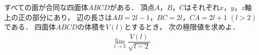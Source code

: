 \documentclass[../../main.tex]{subfiles}
\begin{document}
すべての面が合同な四面体$ABCD$がある．
頂点$A$，$B$，$C$はそれぞれ$x$，$y$，$z$軸上の正の部分にあり，
辺の長さは$AB=2l-1$，$BC=2l$，$CA=2l+1$ $(l>2)$である．
四面体$ABCD$の体積を$V(l)$とするとき，
次の極限値を求めよ．
\begin{align*}
  \lim_{l\to2}\dfrac{V(l)}{\sqrt{l-2}}
\end{align*}
\end{document}
